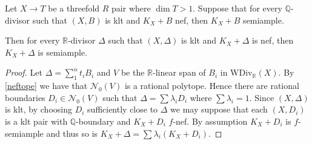 \begin{proposition}\label{QtoR}
	Let $X \to T$ be a threefold $R$ pair where $\dim T >1$. Suppose that for every $\mathbb{Q}$-divisor such that $(X,B)$ is klt and $K_{X}+B$ nef, then $K_{X}+B$ semiample.
	
	Then for every $\mathbb{R}$-divisor $\Delta$ such that $(X,\Delta)$ is klt and $K_X+\Delta$ is nef, then $K_X+\Delta$ is semiample.
\end{proposition}
\begin{proof}
	Let $\Delta= \sum_{1}^{n} t_{i}B_{i}$ and $V$ be the $\mathbb{R}$-linear span of $B_i$ in $\text{WDiv}_\mathbb{R}(X)$. By \autoref{neftope} we have that $\mathcal{N}_{0}(V)$ is a rational polytope. Hence there are rational boundaries $D_{i} \in \mathcal{N}_{0}(V)$ such that $\Delta=\sum \lambda_{i} D_{i}$ where $\sum \lambda_{i} =1$. Since $(X,\Delta)$ is klt, by choosing $D_{i}$ sufficiently close to $\Delta$ we may suppose that each $(X,D_{i})$ is a klt pair with $\mathbb{Q}$-boundary and $K_X+D_i$ $f$-nef. 
	By assumption $K_{X}+D_{i}$ is $f$-semiample and thus so is $K_{X}+\Delta=\sum \lambda_{i} (K_{X}+D_{i})$.
\end{proof}

%
%
%



